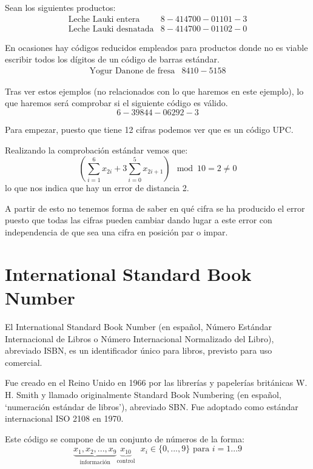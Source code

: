 \begin{example}
Sean los siguientes productos:
\[\begin{array}{ll}
\text{Leche Lauki entera} & 8-414700-01101-3\\
\text{Leche Lauki desnatada} & 8-414700-01102-0
\end{array}\]

En ocasiones hay códigos reducidos empleados para productos donde no es viable escribir todos los dígitos de un código de barras estándar.
\[\begin{array}{ll}
\text{Yogur Danone de fresa} & 8410-5158
\end{array}\]

Tras ver estos ejemplos (no relacionados con lo que haremos en este ejemplo), lo que haremos será comprobar si el siguiente código es válido.
\[6-39844-06292-3\]

Para empezar, puesto que tiene 12 cifras podemos ver que es un código UPC.

Realizando la comprobación estándar vemos que:
\[\left(\sum_{i=1}^6x_{2i} + 3 \sum_{i=0}^5x_{2i+1} \right)\mod 10 = 2 \neq 0\]
lo que nos indica que hay un error de distancia 2.

A partir de esto no tenemos forma de saber en qué cifra se ha producido el error puesto que todas las cifras pueden cambiar dando lugar a este error con independencia de que sea una cifra en posición par o impar.


\end{example}

\section{International Standard Book Number}
\begin{defn}[ISBN]
El International Standard Book Number (en español, Número Estándar Internacional de Libros o Número Internacional Normalizado del Libro), abreviado ISBN, es un identificador único para libros, previsto para uso comercial.

Fue creado en el Reino Unido en 1966 por las librerías y papelerías británicas W. H. Smith y llamado originalmente Standard Book Numbering (en español, ‘numeración estándar de libros’), abreviado SBN. Fue adoptado como estándar internacional ISO 2108 en 1970.
\end{defn}

Este código se compone de un conjunto de números de la forma:
\[\underbrace{x_1,x_2,...,x_9}_{\text{información}}\underbrace{x_{10}}_{\text{control}} \ \ \ x_i \in \{0,...,9\} \text{ para } i=1...9\]

